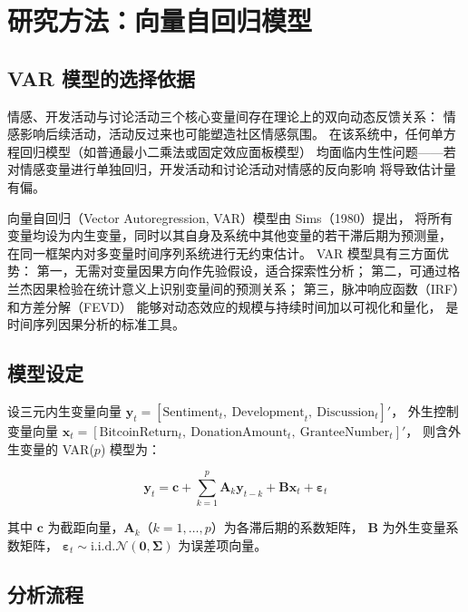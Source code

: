 \section{研究方法：向量自回归模型}

\subsection{VAR 模型的选择依据}

情感、开发活动与讨论活动三个核心变量间存在理论上的双向动态反馈关系：
情感影响后续活动，活动反过来也可能塑造社区情感氛围。
在该系统中，任何单方程回归模型（如普通最小二乘法或固定效应面板模型）
均面临内生性问题——若对情感变量进行单独回归，开发活动和讨论活动对情感的反向影响
将导致估计量有偏。

向量自回归（Vector Autoregression, VAR）模型由 Sims（1980）\cite{sims1980macroeconomics}提出，
将所有变量均设为内生变量，同时以其自身及系统中其他变量的若干滞后期为预测量，
在同一框架内对多变量时间序列系统进行无约束估计。
VAR 模型具有三方面优势：
第一，无需对变量因果方向作先验假设，适合探索性分析；
第二，可通过格兰杰因果检验\cite{granger1969investigating}在统计意义上识别变量间的预测关系；
第三，脉冲响应函数（IRF）和方差分解（FEVD）
能够对动态效应的规模与持续时间加以可视化和量化，
是时间序列因果分析的标准工具。

\subsection{模型设定}

设三元内生变量向量
$\mathbf{y}_t = [\text{Sentiment}_t,\ \text{Development}_t,\ \text{Discussion}_t]'$，
外生控制变量向量
$\mathbf{x}_t = [\text{BitcoinReturn}_t,\ \text{DonationAmount}_t,\ \text{GranteeNumber}_t]'$，
则含外生变量的 VAR($p$) 模型为：

\begin{equation}
\label{eq:var-model}
\mathbf{y}_t = \mathbf{c} + \sum_{k=1}^{p} \mathbf{A}_k \mathbf{y}_{t-k}
+ \mathbf{B} \mathbf{x}_t + \boldsymbol{\varepsilon}_t
\end{equation}

其中 $\mathbf{c}$ 为截距向量，$\mathbf{A}_k$（$k=1,\ldots,p$）为各滞后期的系数矩阵，
$\mathbf{B}$ 为外生变量系数矩阵，
$\boldsymbol{\varepsilon}_t \sim \text{i.i.d.} \mathcal{N}(\mathbf{0}, \boldsymbol{\Sigma})$
为误差项向量。

\subsection{分析流程}

